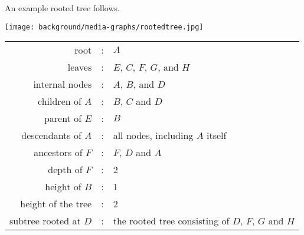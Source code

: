 \begin{cluster}
\label{grp:ex:bg::graphs::rooted-tree}

\begin{example}
\label{ex:bg::graphs::rooted-tree}
An example rooted tree follows.
\begin{center}
  \texttt{[image: background/media-graphs/rootedtree.jpg]}
\end{center}

\begin{center}
\begin{tabular}{rcl}
root & : & $A$\\
leaves & : & $E$, $C$, $F$, $G$, and $H$\\
internal nodes & : & $A$, $B$, and $D$\\
children of $A$ & : & $B$, $C$ and $D$\\
parent of $E$ & : & $B$\\
descendants of $A$ & : & all nodes, including $A$ itself\\
ancestors of $F$ & : & $F$, $D$ and $A$\\
depth of $F$ & : & 2\\
height of $B$ & : & 1\\
height of the tree & : & 2\\
subtree rooted at $D$ & : & the rooted tree consisting of $D$, $F$, $G$ and $H$
\end{tabular}
\end{center}

\end{example}
\end{cluster}

